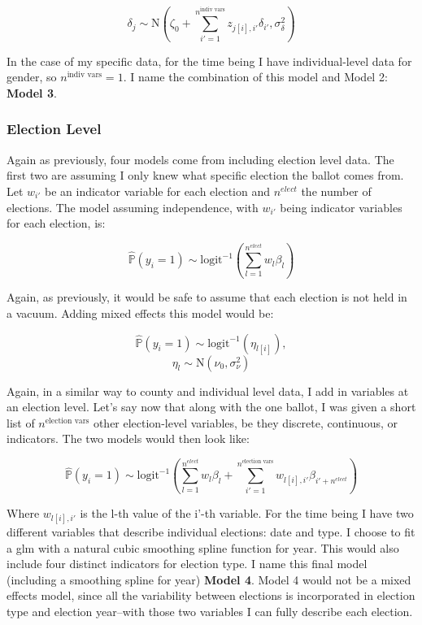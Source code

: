 \documentclass[12pt,twoside]{reedthesis}
\begin{document}
  \[\delta_{j} \sim \text{N}(\zeta_0 + \sum_{i'=1}^{n^{\text{indiv vars}}}z_{j[i], i'}\delta_{i'}, \sigma_{\delta}^2)\]
  
  In the case of my specific data, for the time being I have
  individual-level data for gender, so \(n^{\text{indiv vars}} = 1\). I
  name the combination of this model and Model 2: \textbf{Model 3}.
  
  \subsubsection{Election Level}\label{election-level}
  
  Again as previously, four models come from including election level
  data. The first two are assuming I only knew what specific election the
  ballot comes from. Let \(w_{i'}\) be an indicator variable for each
  election and \(n^{elect}\) the number of elections. The model assuming
  independence, with \(w_{i'}\) being indicator variables for each
  election, is:
  
  \[\hat{\mathbb{P}}(y_i = 1) \sim \text{logit}^{-1}(\sum_{l = 1}^{n^{elect}}w_{l}\beta_{l})\]
  
  Again, as previously, it would be safe to assume that each election is
  not held in a vacuum. Adding mixed effects this model would be:
  
  \[\hat{\mathbb{P}}(y_i = 1) \sim \text{logit}^{-1}(\eta_{l[i]}), \]
  \[\eta_{l} \sim \text{N}(\nu_0, \sigma_{\nu}^2)\]
  
  Again, in a similar way to county and individual level data, I add in
  variables at an election level. Let's say now that along with the one
  ballot, I was given a short list of \(n^{\text{election vars}}\) other
  election-level variables, be they discrete, continuous, or indicators.
  The two models would then look like:
  
  \begin{equation} \tag{Model 4}
  \hat{\mathbb{P}}(y_i = 1) \sim \text{logit}^{-1}(\sum_{l = 1}^{n^{elect}}w_{l}\beta_{l} + \sum_{i'=1}^{n^{\text{election vars}}}w_{l[i], i'}\beta_{i'+n^{elect}})
  \end{equation}
  
  Where \(w_{l[i], i'}\) is the l-th value of the i'-th variable. For the
  time being I have two different variables that describe individual
  elections: date and type. I choose to fit a glm with a natural cubic
  smoothing spline function for year. This would also include four
  distinct indicators for election type. I name this final model
  (including a smoothing spline for year) \textbf{Model 4}. Model 4 would
  not be a mixed effects model, since all the variability between
  elections is incorporated in election type and election year--with those
  two variables I can fully describe each election.
  
\end{document}
